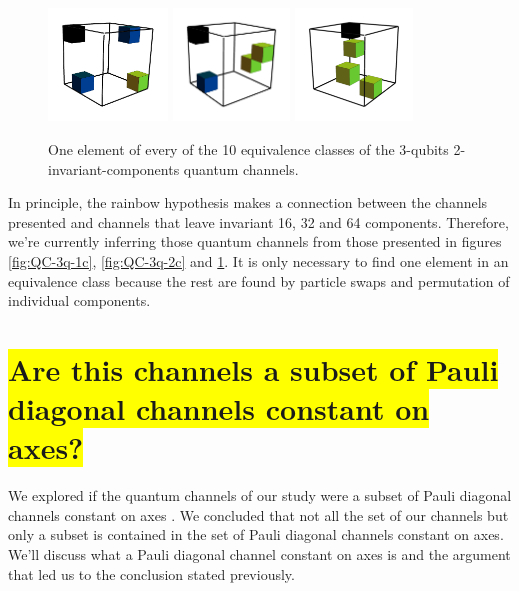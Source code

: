 \documentclass[11pt,dvipsnames]{article} %
\newcommand{\h}[1]{\colorbox{Yellow}{#1}}
\newcommand{\1}{\mathds{1}}
\begin{document}
\begin{figure}[H]
	\hfill
	\includegraphics[height=3cm]{img/3q-4c-no-3}
	\hfill
	\includegraphics[height=3cm]{img/3q-4c-no-4}
	\hfill
	\includegraphics[height=3cm]{img/3q-4c-no-5}
	\hfill \hfill
	\caption{One element of every of the 10 equivalence
	classes of the 3-qubits 2-invariant-components quantum channels.}
	\label{fig:QC-3q-4c}
\end{figure}

In principle, the rainbow hypothesis makes a connection between the 
channels presented and channels that leave invariant 16, 32 and 64
components. Therefore, we're currently inferring those quantum channels
from those presented in figures \ref{fig:QC-3q-1c}, \ref{fig:QC-3q-2c} and
\ref{fig:QC-3q-4c}. It is only necessary to find one element in an 
equivalence class because the rest are found by particle swaps 
and permutation of individual components.

\section*{\h{Are this channels a subset of Pauli diagonal channels constant
on axes?}}

We explored if the quantum channels of our study were a subset 
of Pauli diagonal channels constant on axes \cite{nathanson2007pauli}.
We concluded that not all the set of our channels but only a subset
is contained in the set of Pauli diagonal channels constant on axes.
We'll discuss what a Pauli diagonal channel constant on axes is and 
the argument that led us to the conclusion stated previously.
\end{document}
